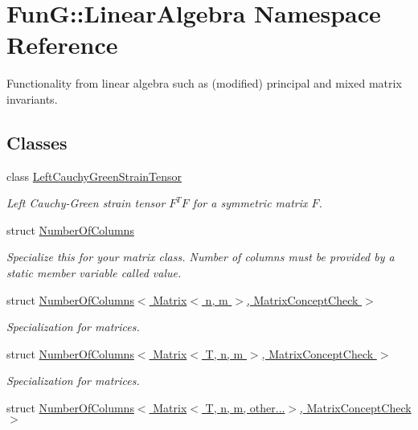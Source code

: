 \hypertarget{namespaceFunG_1_1LinearAlgebra}{}\section{Fun\+G\+:\+:Linear\+Algebra Namespace Reference}
\label{namespaceFunG_1_1LinearAlgebra}


Functionality from linear algebra such as (modified) principal and mixed matrix invariants.  


\subsection*{Classes}
\begin{DoxyCompactItemize}
\item 
class \hyperlink{classFunG_1_1LinearAlgebra_1_1LeftCauchyGreenStrainTensor}{Left\+Cauchy\+Green\+Strain\+Tensor}
\begin{DoxyCompactList}\small\item\em Left Cauchy-\/\+Green strain tensor $ F^T F $ for a symmetric matrix $ F $. \end{DoxyCompactList}\item 
struct \hyperlink{structFunG_1_1LinearAlgebra_1_1NumberOfColumns}{Number\+Of\+Columns}
\begin{DoxyCompactList}\small\item\em Specialize this for your matrix class. Number of columns must be provided by a static member variable called value. \end{DoxyCompactList}\item 
struct \hyperlink{structFunG_1_1LinearAlgebra_1_1NumberOfColumns_3_01Matrix_3_01n_00_01m_01_4_00_01MatrixConceptCheck_01_4}{Number\+Of\+Columns$<$ Matrix$<$ n, m $>$, Matrix\+Concept\+Check $>$}
\begin{DoxyCompactList}\small\item\em Specialization for matrices. \end{DoxyCompactList}\item 
struct \hyperlink{structFunG_1_1LinearAlgebra_1_1NumberOfColumns_3_01Matrix_3_01T_00_01n_00_01m_01_4_00_01MatrixConceptCheck_01_4}{Number\+Of\+Columns$<$ Matrix$<$ T, n, m $>$, Matrix\+Concept\+Check $>$}
\begin{DoxyCompactList}\small\item\em Specialization for matrices. \end{DoxyCompactList}\item 
struct \hyperlink{structFunG_1_1LinearAlgebra_1_1NumberOfColumns_3_01Matrix_3_01T_00_01n_00_01m_00_01other_8_8_8_4_00_01MatrixConceptCheck_01_4}{Number\+Of\+Columns$<$ Matrix$<$ T, n, m, other...$>$, Matrix\+Concept\+Check $>$}

\end{DoxyCompactItemize}
